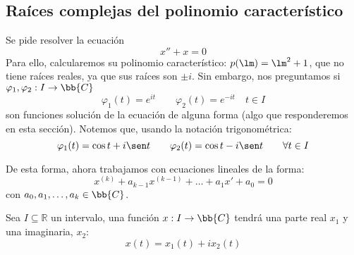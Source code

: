 \subsection{Raíces complejas del polinomio característico}
\begin{ejemplo}
    Se pide resolver la ecuación
    \begin{equation*}
        x'' + x = 0
    \end{equation*}
    Para ello, calcularemos su polinomio característico: $p(\lm) = \lm^2 + 1$, que no tiene raíces reales, ya que sus raíces son $\pm i$. Sin embargo, nos preguntamos si $\varphi_1,\varphi_2:I\rightarrow\bb{C}$
    \begin{equation*}
        \varphi_1(t) = e^{it} \qquad \varphi_2(t) = e^{-it} \quad t\in I
    \end{equation*}
    son funciones solución de la ecuación de alguna forma (algo que responderemos en esta sección). Notemos que, usando la notación trigonométrica:
    \begin{equation*}
        \varphi_1(t) = \cos t + i\sen t \qquad \varphi_2(t) = \cos t - i\sen t \qquad \forall t\in I
    \end{equation*}
\end{ejemplo}

De esta forma, ahora trabajamos con ecuaciones lineales de la forma:
\begin{equation}\label{eq:lin_homog_cte_complejo}
    x^{(k)} + a_{k-1}x^{(k-1)} + \ldots + a_1 x' + a_0 = 0
\end{equation}
con $a_0,a_1,\ldots,a_k \in \bb{C}$.

\noindent
Sea $I\subseteq \mathbb{R}$ un intervalo, una función $x:I\rightarrow\bb{C}$ tendrá una parte real $x_1$ y una imaginaria, $x_2$:
\begin{equation*}
    x(t) = x_1(t) + ix_2(t)
\end{equation*}

